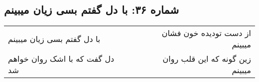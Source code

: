 \begin{center}
\section*{شماره ۳۶: با دل گفتم بسی زیان میبینم}
\label{sec:036}
\begin{longtable}{l p{0.5cm} r}
با دل گفتم بسی زیان میبینم
&&
از دست تودیده خون فشان میبینم
\\
دل گفت که با اشک روان خواهم شد
&&
زین گونه که این قلب روان میبینم
\\
\end{longtable}
\end{center}
